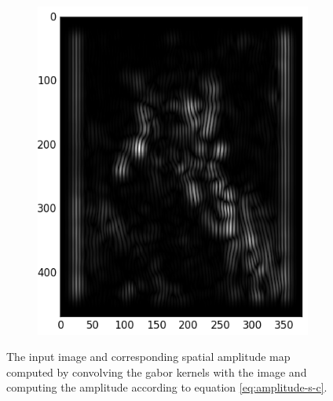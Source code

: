 \documentclass[]{article}
\begin{document}
\begin{figure}
\begin{subfigure}[t]{0.49\textwidth}
      \includegraphics[width=1.\linewidth]{gabor_output.png}
    \end{subfigure}
    \caption{The input image and corresponding spatial amplitude map computed by
    convolving the gabor kernels with the image and computing the amplitude
    according to equation \ref{eq:amplitude-s-c}.}
    \label{fig:gabor-input-output}
\end{figure}
\end{document}
